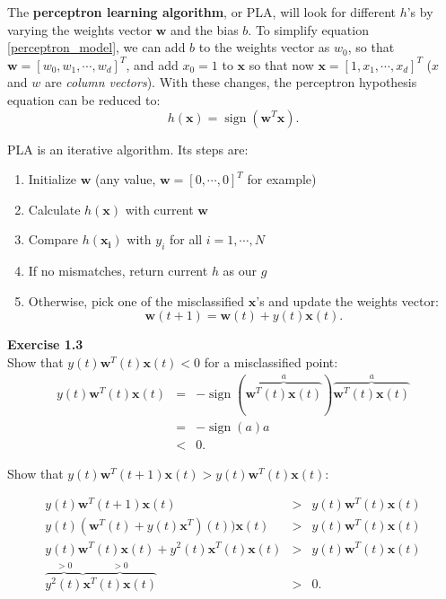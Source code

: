 \documentclass[11pt]{article}
\begin{document}
The \textbf{perceptron learning algorithm}, or PLA, will look for different $h$'s by varying the weights vector $\mathbf{w}$ and the bias $b$. To simplify equation \ref{perceptron_model}, we can add $b$ to the weights vector as $w_0$, so that $\mathbf{w}=[w_0,w_1,\dotsb,w_d]^T$, and add $x_0=1$ to $\mathbf{x}$ so that now $\mathbf{x}=[1,x_1,\dotsb,x_d]^T$ ($x$ and $w$ are \emph{column vectors}). With these changes, the perceptron hypothesis equation can be reduced to:
\begin{equation}
h(\mathbf{x})=\operatorname{sign}(\mathbf{w}^T\mathbf{x}).
\end{equation}

PLA is an iterative algorithm. Its steps are:
\begin{enumerate}
\item Initialize $\mathbf{w}$ (any value, $\mathbf{w}=[0,\dotsb,0]^T$ for example)
\item Calculate $h(\mathbf{x})$ with current $\mathbf{w}$
\item Compare $h(\mathbf{x_i})$ with $y_i$ for all $i=1,\dotsb,N$
\item If no mismatches, return current $h$ as our $g$
\item Otherwise, pick one of the misclassified $\mathbf{x}$'s and update the weights vector: $$\mathbf{w}(t+1)=\mathbf{w}(t)+y(t)\mathbf{x}(t).$$ 
\end{enumerate}

\textbf{Exercise 1.3}\\

Show that $y(t)\mathbf{w}^T(t)\mathbf{x}(t)<0$ for a misclassified point:
\begin{eqnarray*}
y(t)\mathbf{w}^T(t)\mathbf{x}(t)&=&-\operatorname{sign}(\overbrace{\mathbf{w}^T(t)\mathbf{x}(t)}^a)\overbrace{\mathbf{w}^T(t)\mathbf{x}(t)}^a\\
&=&-\operatorname{sign}(a)a\\
&<&0.
\end{eqnarray*}

Show that $y(t)\mathbf{w}^T(t+1)\mathbf{x}(t)>y(t)\mathbf{w}^T(t)\mathbf{x}(t)$:

\begin{eqnarray*}
y(t)\mathbf{w}^T(t+1)\mathbf{x}(t)&>&y(t)\mathbf{w}^T(t)\mathbf{x}(t)\\
y(t)(\mathbf{w}^T(t)+y(t)\mathbf{x}^T)(t))\mathbf{x}(t)&>&y(t)\mathbf{w}^T(t)\mathbf{x}(t)\\
y(t)\mathbf{w}^T(t)\mathbf{x}(t)+y^2(t)\mathbf{x}^T(t)\mathbf{x}(t)&>&y(t)\mathbf{w}^T(t)\mathbf{x}(t)\\
\overbrace{y^2(t)}^{>0}\overbrace{\mathbf{x}^T(t)\mathbf{x}(t)}^{>0}&>&0.
\end{eqnarray*}
\end{document}
